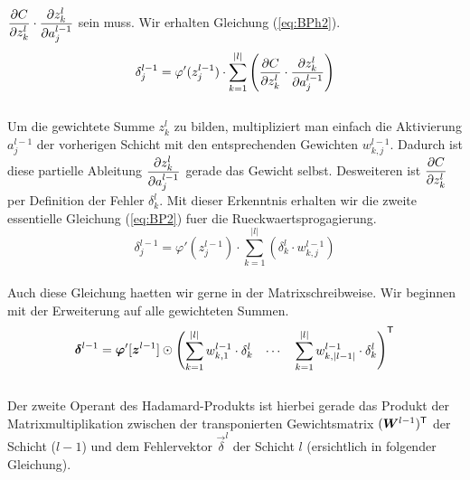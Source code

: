 $\displaystyle\frac{\partial C}{\partial z_k^l} \cdot \displaystyle\frac{\partial z_k^l}{\partial a_j^{l-1}}$ sein muss. Wir
erhalten Gleichung (\ref{eq:BPh2}).
\\
\begin{equation}\label{eq:BPh2}
  \delta_j^{l-1} = \varphi'(z_j^{l-1}) \cdot \sum_{k=1}^{|l|} \left( \frac{\partial C}{\partial z_k^l} \cdot \frac{\partial z_k^l}{\partial a_j^{l-1}} \right)
\end{equation}
\\
Um die gewichtete Summe $z_k^l$ zu bilden, multipliziert man einfach die
Aktivierung $a_j^{l-1}$ der vorherigen Schicht mit den entsprechenden Gewichten $w_{k,j}^{l-1}$.
Dadurch ist diese partielle Ableitung $\displaystyle\frac{\partial z_k^l}{\partial a_j^{l-1}}$ gerade das
Gewicht selbst. Desweiteren ist $\displaystyle\frac{\partial C}{\partial z_k^l}$ per Definition der
Fehler $\delta_k^l$. Mit dieser Erkenntnis erhalten wir die zweite essentielle
Gleichung (\ref{eq:BP2}) fuer die Rueckwaertsprogagierung.
\\
\begin{equation}\tag{BP2}\label{eq:BP2}
  \delta_j^{l-1} = \varphi'(z_j^{l-1}) \cdot \sum_{k=1}^{|l|} \left( \delta_k^l \cdot w_{k,j}^{l-1} \right)
\end{equation}
\\
Auch diese Gleichung haetten wir gerne in der Matrixschreibweise. Wir beginnen
mit der Erweiterung auf alle gewichteten Summen.
\\
\begin{equation*}
  \bm{\delta}^{l-1} = \bm{\varphi}'[\bm{z}^{l-1}] \odot \begin{pmatrix} \displaystyle\sum_{k=1}^{|l|} w_{k,1}^{l-1} \cdot \delta_k^l & \cdots & \displaystyle\sum_{k=1}^{|l|} w_{k,|l-1|}^{l-1} \cdot \delta_k^l \end{pmatrix}^{\mathsf{T}}
\end{equation*}
\\
Der zweite Operant des Hadamard-Produkts ist hierbei gerade das Produkt der
Matrixmultiplikation zwischen
der transponierten Gewichtsmatrix $(\bm{W}^{l-1})^{\mathsf{T}}$ der Schicht ($l-1$)
und dem Fehlervektor $\vec{\delta}^l$ der Schicht $l$ (ersichtlich in folgender Gleichung).

